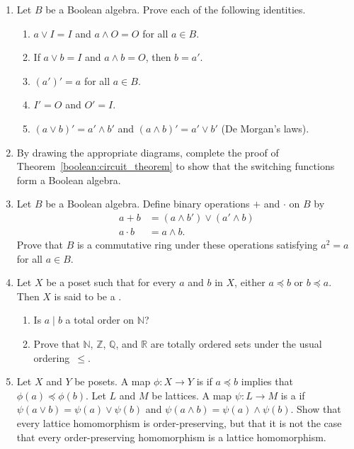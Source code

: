 {\begin{enumerate}
 
\item
Let $B$ be a Boolean algebra. Prove each of the following identities.
\begin{enumerate}
 
 \item
$a \vee I = I$ and $a \wedge O = O$ for all $a \in B$. 
 
 \item
If $a \vee b = I$ and $a \wedge b = O$, then $b = a'$.
 
 \item
$(a')'=a$ for all $a \in B$.
 
 \item
$I' = O$ and $O' = I$.
 
 \item
$(a \vee b)' = a' \wedge b'$ and $(a \wedge b)' = a' \vee b'$ (De
Morgan's laws).
 
\end{enumerate}
 
 
\item 
By drawing the appropriate diagrams, complete the proof of
Theorem~\ref{boolean:circuit_theorem} to show that the switching functions form a Boolean
algebra. 
 
 
\item
Let $B$ be a Boolean algebra. Define binary operations $+$ and
$\cdot$ on $B$ by
\begin{align*}
a + b & = (a \wedge b') \vee (a' \wedge b) \\
a \cdot b & = a \wedge b.
\end{align*}
Prove that $B$ is a commutative ring under these operations
satisfying $a^2 = a$ for all $a \in B$.
 
 
\item
Let $X$  be a poset such that for every $a$ and $b$ in $X$, either $a
\preceq  b$ or $b \preceq a$. Then $X$ is said to be a .
\begin{enumerate}			

 \item
Is $a \mid b$ a total order on ${\mathbb N}$?
 
 \item
Prove that ${\mathbb N}$, ${\mathbb Z}$, ${\mathbb Q}$, and ${\mathbb R}$ are
totally ordered sets under the usual ordering~$\leq$.
 
 
\end{enumerate}
 
 
\item
Let $X$ and $Y$ be posets.  A map $\phi : X \rightarrow Y$ is  if $a \preceq b$
implies that $\phi(a) \preceq \phi(b)$.  Let $L$ and $M$ be lattices.
A map $\psi: L \rightarrow M$ is a 
if $\psi( a \vee b ) = \psi(a) \vee \psi(b)$ and $\psi( a \wedge b ) =
\psi(a) \wedge \psi(b)$. Show that every lattice homomorphism is
order-preserving, but that it is not the case that every
order-preserving homomorphism is a lattice homomorphism.  
 

\end{enumerate}}
